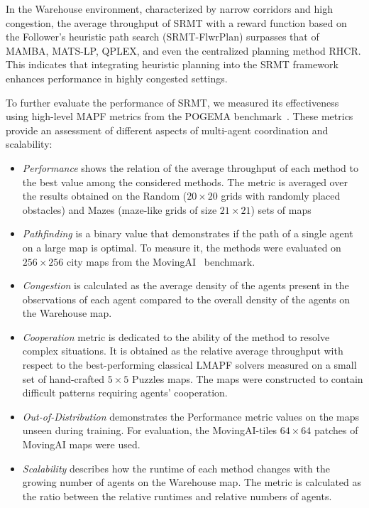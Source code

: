 \documentclass{article} %
\begin{document}
In the Warehouse environment, characterized by narrow corridors and high congestion, the average throughput of SRMT with a reward function based on the Follower's heuristic path search (SRMT-FlwrPlan) surpasses that of MAMBA, MATS-LP, QPLEX, and even the centralized planning method RHCR. This indicates that integrating heuristic planning into the SRMT framework enhances performance in highly congested settings.

To further evaluate the performance of SRMT, we measured its effectiveness using high-level MAPF metrics from the POGEMA benchmark~\citep{skrynnik2024pogema}. These metrics provide an assessment of different aspects of multi-agent coordination and scalability:
\begin{itemize}
    \item \textit{Performance} shows the relation of the average throughput of each method to the best value among the considered methods. The metric is averaged over the results obtained on the Random  ($20\times 20$ grids with randomly placed obstacles) and Mazes (maze-like grids of size $21\times 21$) sets of maps
    \item \textit{Pathfinding} is a binary value that demonstrates if the path of a single agent on a large map is optimal. To measure it, the methods were evaluated on $256\times 256$ city maps from the MovingAI~\citep{stern2019multi} benchmark.
    \item \textit{Congestion} is calculated as the average density of the agents present in the observations of each agent compared to the overall density of the agents on the Warehouse map.
    \item \textit{Cooperation} metric is dedicated to the ability of the method to resolve complex situations. It is obtained as the relative average throughput with respect to the best-performing classical LMAPF solvers measured on a small set of hand-crafted $5\times 5$ Puzzles maps. The maps were constructed to contain difficult patterns requiring agents' cooperation.
    \item \textit{Out-of-Distribution} demonstrates the Performance metric values on the maps unseen during training. For evaluation, the MovingAI-tiles $64\times 64$ patches of MovingAI maps were used.
    \item \textit{Scalability} describes how the runtime of each method changes with the growing number of agents on the Warehouse map. The metric is calculated as the ratio between the relative runtimes and relative numbers of agents.
\end{itemize}
\end{document}
